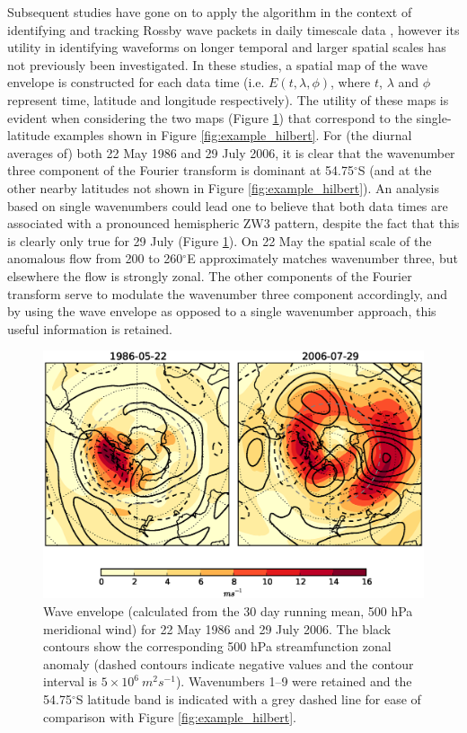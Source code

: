 Subsequent studies have gone on to apply the \citet{Zimin2003} algorithm in the context of identifying and tracking Rossby wave packets in daily timescale data \citep{Glatt2014,Souders2014}, however its utility in identifying waveforms on longer temporal and larger spatial scales has not previously been investigated. In these studies, a spatial map of the wave envelope is constructed for each data time (i.e. $E(t,\lambda,\phi)$, where $t$, $\lambda$ and $\phi$ represent time, latitude and longitude respectively). The utility of these maps is evident when considering the two maps (Figure \ref{fig:example_envelope}) that correspond to the single-latitude examples shown in Figure \ref{fig:example_hilbert}. For (the diurnal averages of) both 22 May 1986 and 29 July 2006, it is clear that the wavenumber three component of the Fourier transform is dominant at 54.75$^{\circ}$S (and at the other nearby latitudes not shown in Figure \ref{fig:example_hilbert}). An analysis based on single wavenumbers could lead one to believe that both data times are associated with a pronounced hemispheric ZW3 pattern, despite the fact that this is clearly only true for 29 July (Figure \ref{fig:example_envelope}). On 22 May the spatial scale of the anomalous flow from 200 to 260$^{\circ}$E approximately matches wavenumber three, but elsewhere the flow is strongly zonal. The other components of the Fourier transform serve to modulate the wavenumber three component accordingly, and by using the wave envelope as opposed to a single wavenumber approach, this useful information is retained.

\begin{figure}
\begin{center}
\includegraphics[width=0.84\columnwidth]{figures/zonalwaves/envva-w19_ERAInterim_500hPa_030day-runmean_native_1986-05-22_2006-07-29.eps}
\caption[Spatial wave envelope field (calculated from the 30 day running mean, 500 hPa meridional wind) for 22 May 1986 and 29 July 2006]{\label{fig:example_envelope}
Wave envelope (calculated from the 30 day running mean, 500 hPa meridional wind) for 22 May 1986 and 29 July 2006. The black contours show the corresponding 500 hPa streamfunction zonal anomaly (dashed contours indicate negative values and the contour interval is $5 \times 10^6 \: m^2 s^{-1}$). Wavenumbers 1--9 were retained and the 54.75$^{\circ}$S latitude band is indicated with a grey dashed line for ease of comparison with Figure \ref{fig:example_hilbert}. %
}
\end{center}
\end{figure}


